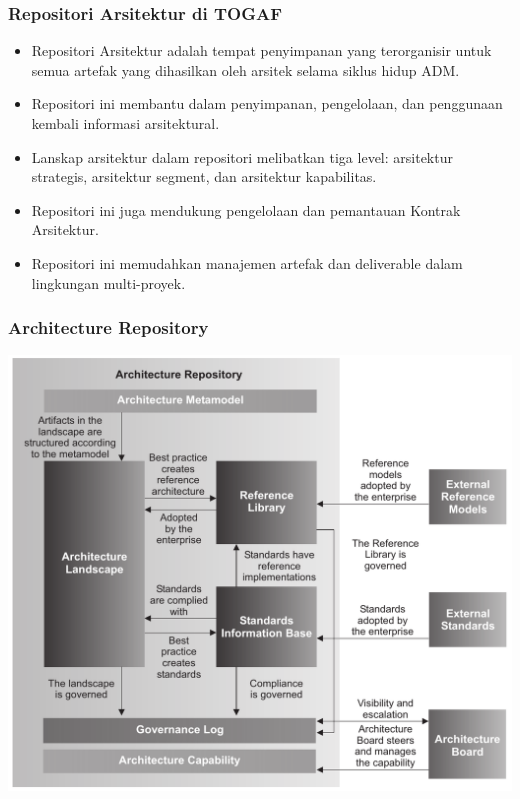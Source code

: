 \documentclass[aspectratio=169]{beamer}
\begin{document}
	\begin{frame}
		\frametitle{Repositori Arsitektur di TOGAF}
		\begin{itemize}
			\item Repositori Arsitektur adalah tempat penyimpanan yang terorganisir untuk semua artefak yang dihasilkan oleh arsitek selama siklus hidup ADM.
			\item Repositori ini membantu dalam penyimpanan, pengelolaan, dan penggunaan kembali informasi arsitektural.
			\item Lanskap arsitektur dalam repositori melibatkan tiga level: arsitektur strategis, arsitektur segment, dan arsitektur kapabilitas.
			\item Repositori ini juga mendukung pengelolaan dan pemantauan Kontrak Arsitektur.
			\item Repositori ini memudahkan manajemen artefak dan deliverable dalam lingkungan multi-proyek.
		\end{itemize}
	\end{frame}
	
	
	{
		\begin{frame}
			\frametitle{Architecture Repository}
			\begin{center}
				\includegraphics[width=.65\textwidth]{../figures/architecture_repository}
			\end{center}
		\end{frame}
	}
	
	
	
\end{document}
